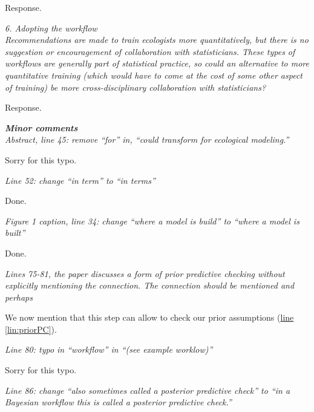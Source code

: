 \documentclass[11pt,letter]{article}
\begin{document}
Response.

\begin{mybox}
\emph{6. Adopting the workflow\\
Recommendations are made to train ecologists more quantitatively, but there is no suggestion or encouragement of collaboration with statisticians. These types of workflows are generally part of statistical practice, so could an alternative to more quantitative training (which would have to come at the cost of some other aspect of training) be more cross-disciplinary collaboration with statisticians?}
\end{mybox}

Response.

\begin{mybox}
\emph{\textbf{Minor comments}\\
Abstract, line 45: remove “for” in, “could transform for ecological modeling.”}
\end{mybox}

Sorry for this typo.

\begin{mybox}
\emph{Line 52: change “in term” to “in terms”}
\end{mybox}

Done.

\begin{mybox}
\emph{Figure 1 caption, line 34: change “where a model is build” to “where a model is built”}
\end{mybox}

Done.

\begin{mybox}
\emph{Lines 75-81, the paper discusses a form of prior predictive checking without explicitly mentioning the connection. The connection should be mentioned and perhaps}
\end{mybox}

We now mention that this step can allow to check our prior assumptions (\href{file:forecastflows_r1\#lintarget:priorPC}{line \ref*{lin:priorPC}}).

\begin{mybox}
\emph{Line 80: typo in “workflow” in “(see example worklow)”}
\end{mybox}

Sorry for this typo.

\begin{mybox}
\emph{Line 86: change “also sometimes called a posterior predictive check” to “in a Bayesian workflow this is called a posterior predictive check.”}
\end{mybox}
\end{document}
